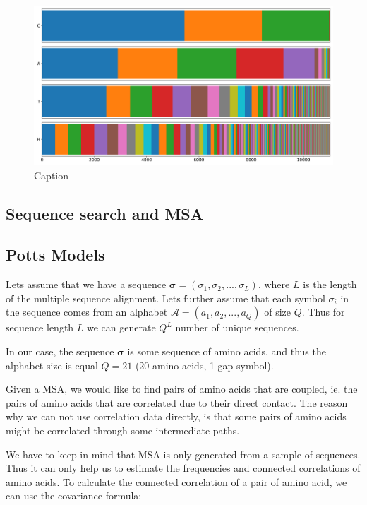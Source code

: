 \begin{figure}
    \centering
    \includegraphics[scale=0.4]{imgs_tomas/cath_distributions_filtered.png}
    \caption{Caption}
    \label{fig:cath_filtered}
\end{figure}

\subsection{Sequence search and MSA}


\subsection{Potts Models}

Lets assume that we have a sequence $\boldsymbol{\sigma} = (\sigma_1, \sigma_2, ..., \sigma_L)$, where $L$ is the length of the multiple sequence alignment. 
Lets further assume that each symbol $\sigma_i$ in the sequence comes from an alphabet $\mathcal{A} = (a_1, a_2, ..., a_Q)$ of size $Q$. 
Thus for sequence length $L$ we can generate $Q^L$ number of unique sequences.
    
In our case, the sequence $\boldsymbol{\sigma}$ is some sequence of amino acids, and thus the alphabet size is equal $Q = 21$ (20 amino acids, 1 gap symbol).
        
Given a MSA, we would like to find pairs of amino acids that are coupled, ie. the pairs of amino acids that are correlated due to their direct contact. 
The reason why we can not use correlation data directly, is that some pairs of amino acids might be correlated through some intermediate paths.
        
We have to keep in mind that MSA is only generated from a sample of sequences. 
Thus it can only help us to estimate the frequencies and connected correlations of amino acids. 
To calculate the connected correlation of a pair of amino acid, we can use the covariance formula:
            
